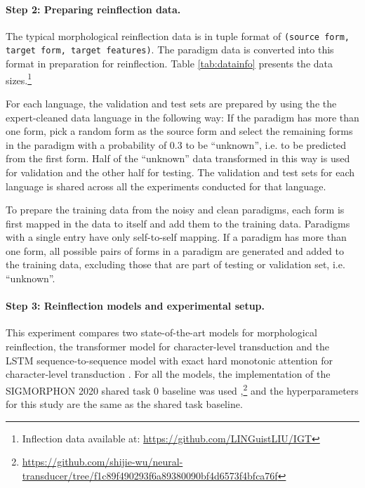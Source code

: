 \paragraph{Step 2: Preparing reinflection data.}
The typical morphological reinflection data is in tuple format of \texttt{(source form, target form, target features)}. The paradigm data is converted into this format in preparation for reinflection. Table \ref{tab:datainfo} presents the data sizes.\footnote{Inflection data available at: \url{https://github.com/LINGuistLIU/IGT}} 

For each language, the validation and test sets are prepared by using the the expert-cleaned data language in the following way: If the paradigm has more than one form, pick a random form as the source form and select the remaining forms in the paradigm with a probability of 0.3 to be ``unknown'', i.e. to be predicted from the first form. Half of the ``unknown'' data transformed in this way is used for validation and the other half for testing. The validation and test sets for each language is shared across all the experiments conducted for that language.

To prepare the training data from the noisy and clean paradigms, each form is first mapped in the data to itself and add them to the training data. Paradigms with a single entry have only self-to-self mapping. If a paradigm has more than one form, all possible pairs of forms in a paradigm are generated and added to the training data, excluding those that are part of testing or validation set, i.e. ``unknown''.
 

\paragraph{Step 3: Reinflection models and experimental setup.}
This experiment compares two state-of-the-art models for morphological reinflection, the transformer model for character-level transduction \citep{wu2020applying} and the LSTM sequence-to-sequence model with exact hard monotonic attention for character-level transduction \citep{wu-cotterell-2019-exact}. For all the models, the implementation of the SIGMORPHON 2020 shared task 0 baseline was used \citep{vylomova2020sigmorphon},\footnote{\url{https://github.com/shijie-wu/neural-transducer/tree/f1c89f490293f6a89380090bf4d6573f4bfca76f}} and the hyperparameters for this study are the same as the shared task baseline.

